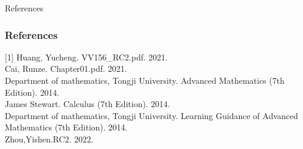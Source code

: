 	\begin{frame}{References}
	    \frametitle{References}
		[1] Huang, Yucheng. VV156\_RC2.pdf. 2021.\\
		\bigskip
		[2] Cai, Runze. Chapter01.pdf. 2021.\\
		\bigskip
		[3] Department of mathematics, Tongji University. Advanced Mathematics (7th Edition). 2014.\\
		\bigskip
		[4] James Stewart. Calculus (7th Edition). 2014.\\
		\bigskip
		[5] Department of mathematics, Tongji University. Learning Guidance of Advanced Mathematics (7th Edition). 2014.\\
		\bigskip
		[6]Zhou,Yishen.RC2. 2022.
	\end{frame}